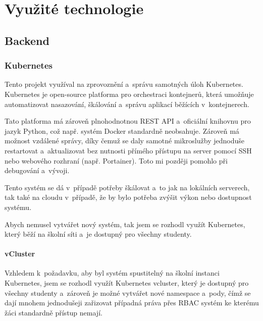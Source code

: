 \documentclass[12pt, a4paper,
oneside,      %
openright
]{report}
\begin{document}

\chapter{Využité technologie}

\section{Backend}

\subsection{Kubernetes}
Tento projekt využíval na zprovoznění a~správu samotných úloh Kubernetes. Kubernetes je open-source platforma pro orchestraci kontejnerů, která umožňuje automatizovat nasazování, škálování a~správu aplikací běžících v~kontejnerech. 

Tato platforma má zároveň plnohodnotnou REST API a~oficiální knihovnu pro jazyk Python, což např. systém Docker standardně neobsahuje. Zároveň má možnost vzdálené správy, díky čemuž se daly samotné mikroslužby jednoduše restartovat a~aktualizovat bez nutnosti přímého přístupu na server pomocí SSH nebo webového rozhraní (např. Portainer). Toto mi později pomohlo při debugování a~vývoji.

Tento systém se dá v~případě potřeby škálovat a~to jak na lokálních serverech, tak také na cloudu v~případě, že by bylo potřeba zvýšit výkon nebo dostupnost systému.

Abych nemusel vytvářet nový systém, tak jsem se rozhodl využít Kubernetes, který běží na školní síti a~je dostupný pro všechny studenty.

\subsubsection{vCluster}
Vzhledem k~požadavku, aby byl systém spustitelný na školní instanci Kubernetes, jsem se rozhodl využít Kubernetes vcluster, který je dostupný pro všechny studenty a~zároveň je možné vytvářet nové namespace a~pody, čímž se dají mnohem jednodušeji zařizovat případná práva přes RBAC systém ke kterému žáci standardně přístup nemají.
\end{document}
